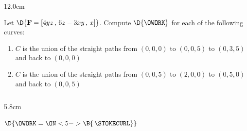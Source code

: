 \begin{frame}
\begin{columns}\begin{column}{12.0cm}
\scriptsize


Let $\D{{\bf F} = [4yz\,,\,6z-3xy\,,\, x]}$. Compute $\D{\OWORK}$ for each of the following curves:
\begin{enumerate}
	\item[a.] $C$ is the union of the straight paths from $(0,0,0)$ to $(0,0,5)$ to $(0,3,5)$ and back to $(0,0,0)$
	
	\vspace{0.2cm}
	
	\item[b.] $C$ is the union of the straight paths from $(0,0,5)$ to $(2,0,0)$ to $(0,5,0)$ and back to $(0,0,5)$
			
\end{enumerate}

\vspace{0.2cm}

\begin{columns}
\begin{column}{5.8cm}
\vspace{0.2cm}

	
	\vspace{0.3cm}
	
	
	\vspace{0.6cm}
	
	$\D{\OWORK = 
\ON<5->{\B{\,\STOKECURL}}}$

\vspace{0.2cm}

\hspace{0.9cm} 

\vspace{0.2cm}

\hspace{0.9cm} 

\vspace{0.2cm}

\hspace{0.9cm} 


\end{column}
\end{columns}
\end{column}
\end{columns}
\end{frame}
